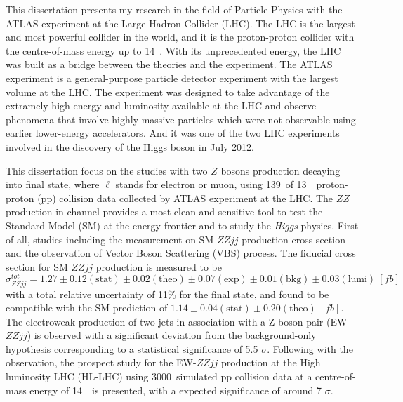 \begin{enabstract}
This dissertation presents my research in the field of Particle Physics with the ATLAS experiment at the Large Hadron Collider (LHC). 
The LHC is the largest and most powerful collider in the world, and it is the proton-proton collider with the centre-of-mass energy up to 14~\tev.
With its unprecedented energy, the LHC was built as a bridge between the theories and the experiment.
The ATLAS experiment is a general-purpose particle detector experiment with the largest volume at the LHC.
The experiment was designed to take advantage of the extramely high energy and luminosity available at the LHC 
and observe phenomena that involve highly massive particles which were not observable using earlier lower-energy accelerators.
And it was one of the two LHC experiments involved in the discovery of the Higgs boson in July 2012.

This dissertation focus on the studies with two $Z$ bosons production decaying into \llll final state, where $\ell$ stands for electron or muon, using 139~\ifb of 13~\tev~proton-proton (pp) collision data collected by ATLAS experiment at the LHC.
The $ZZ$ production in \llll channel provides a most clean and sensitive tool to test the Standard Model (SM) at the energy frontier and to study the \textit{Higgs} physics.
First of all, studies including the measurement on SM $ZZjj$ production cross section and the observation of Vector Boson Scattering (VBS) process.
The fiducial cross section for SM $ZZjj$ production is measured to be 
    $\sigma_{ZZjj}^{tot} = 1.27 \pm 0.12 (\mathrm{stat}) \pm 0.02 (\mathrm{theo}) \pm 0.07 (\mathrm{exp}) \pm 0.01 (\mathrm{bkg}) \pm 0.03 (\mathrm{lumi})~[fb]$
    with a total relative uncertainty of 11\% for the \llll final state, and found to be compatible with the SM prediction of $1.14 \pm 0.04 (\mathrm{stat}) \pm 0.20 (\mathrm{theo})~[fb]$.
The electroweak production of two jets in association with a Z-boson pair (EW-$ZZjj$) is observed with
a significant deviation from the background-only hypothesis corresponding to a statistical significance of 5.5 $\sigma$.
Following with the observation, the prospect study for the EW-$ZZjj$ production at the High luminosity LHC (HL-LHC) using 3000~\ifb simulated pp collision data at a centre-of-mass energy of 14~\tev~is presented,
with a expected significance of around 7 $\sigma$.


\end{enabstract}
